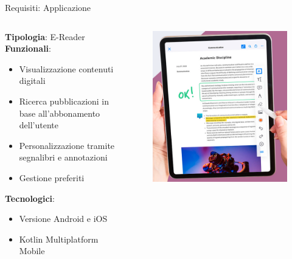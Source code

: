 \begin{frame}{Requisiti: Applicazione}
    \begin{columns}[onlytextwidth]
        \begin{column}{0.5\textwidth}
            \textbf{Tipologia}: E-Reader\\
            \vspace{5mm}
            \textbf{Funzionali}:
            \begin{itemize}
                \item Visualizzazione contenuti digitali
                \item Ricerca pubblicazioni in base all'abbonamento dell'utente
                \item Personalizzazione tramite segnalibri e annotazioni
                \item Gestione preferiti
            \end{itemize}
            \vspace{5mm}
            \textbf{Tecnologici}:
            \begin{itemize}
                \item Versione Android e iOS
                \item Kotlin Multiplatform Mobile
            \end{itemize}
        \end{column}
        \begin{column}{0.45\textwidth}
             \begin{figure}[H]
                \includegraphics[width=1\textwidth]{img/e-reader.png}
            \end{figure}
        \end{column}
    \end{columns}
\end{frame}